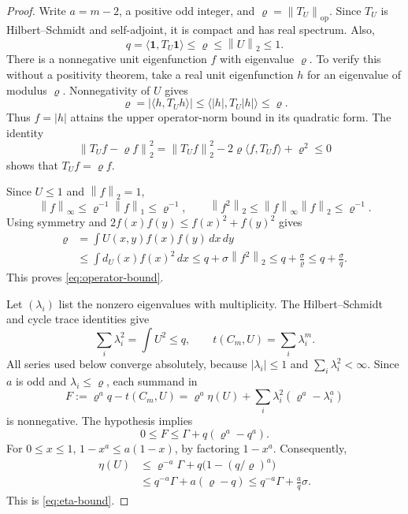\documentclass[11pt]{article}
\theoremstyle{remark}
\newcommand{\ind}{\mathbf{1}}
\newcommand{\op}{\mathrm{op}}
\newcommand{\norm}[1]{\left\lVert #1\right\rVert}
\newcommand{\abs}[1]{\left\lvert #1\right\rvert}
\begin{document}
\begin{proof}
Write $a=m-2$, a positive odd integer, and
$\varrho=\norm{T_U}_{\op}$. Since $T_U$ is Hilbert--Schmidt and
self-adjoint, it is compact and has real spectrum. Also,
\[
 q=\langle\ind,T_U\ind\rangle\leq\varrho
 \leq\norm{U}_2\leq1.
\]
There is a nonnegative unit eigenfunction $f$ with eigenvalue
$\varrho$. To verify this without a positivity theorem, take a real
unit eigenfunction $h$ for an eigenvalue of modulus $\varrho$.
Nonnegativity of $U$ gives
\[
 \varrho=\abs{\langle h,T_Uh\rangle}
 \leq\langle |h|,T_U|h|\rangle\leq\varrho.
\]
Thus $f=|h|$ attains the upper operator-norm bound in its quadratic
form. The identity
\[
 \norm{T_Uf-\varrho f}_2^2
 =\norm{T_Uf}_2^2-2\varrho\langle f,T_Uf\rangle+\varrho^2
 \leq0
\]
shows that $T_Uf=\varrho f$.

Since $U\leq1$ and $\norm{f}_2=1$,
\[
 \norm{f}_\infty
 \leq\varrho^{-1}\norm{f}_1\leq\varrho^{-1},
 \qquad \norm{f^2}_2\leq\norm{f}_\infty\norm{f}_2
 \leq\varrho^{-1}.
\]
Using symmetry and $2f(x)f(y)\leq f(x)^2+f(y)^2$ gives
\begin{align*}
 \varrho
 &=\int U(x,y)f(x)f(y)\,dx\,dy\\
 &\leq\int d_U(x)f(x)^2\,dx
 \leq q+\sigma\norm{f^2}_2
 \leq q+\frac{\sigma}{\varrho}
 \leq q+\frac{\sigma}{q}.
\end{align*}
This proves \eqref{eq:operator-bound}.

Let $(\lambda_i)$ list the nonzero eigenvalues with multiplicity.
The Hilbert--Schmidt and cycle trace identities give
\[
 \sum_i\lambda_i^2=\int U^2\leq q,
 \qquad t(C_m,U)=\sum_i\lambda_i^m.
\]
All series used below converge absolutely, because
$|\lambda_i|\leq1$ and $\sum_i\lambda_i^2<\infty$.
Since $a$ is odd and $\lambda_i\leq\varrho$, each summand in
\begin{equation}\label{eq:F}
 F:=\varrho^a q-t(C_m,U)
 =\varrho^a\eta(U)
  +\sum_i\lambda_i^2(\varrho^a-\lambda_i^a)
\end{equation}
is nonnegative. The hypothesis implies
\begin{equation}\label{eq:F-upper}
 0\leq F\leq\Gamma+q(\varrho^a-q^a).
\end{equation}
For $0\leq x\leq1$,
$1-x^a\leq a(1-x)$, by factoring $1-x^a$.
Consequently,
\begin{align*}
 \eta(U)
 &\leq\varrho^{-a}\Gamma
       +q\bigl(1-(q/\varrho)^a\bigr)\\
 &\leq q^{-a}\Gamma+a(\varrho-q)
 \leq q^{-a}\Gamma+\frac{a}{q}\sigma.
\end{align*}
This is \eqref{eq:eta-bound}.


\end{proof}
\end{document}
